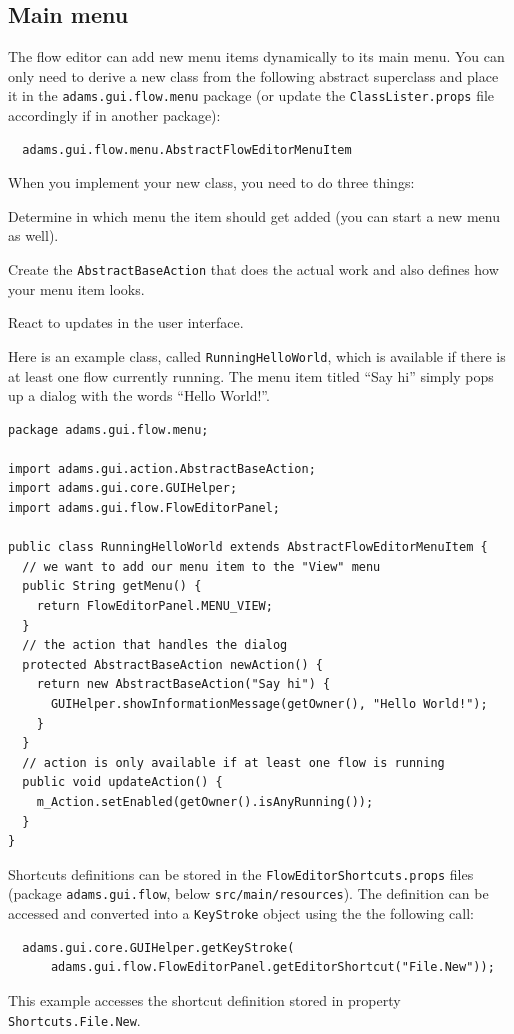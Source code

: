 \subsection{Main menu}
\label{floweditor_mainmenu}
The flow editor can add new menu items dynamically to its main menu. You can
only need to derive a new class from the following abstract superclass and
place it in the \texttt{adams.gui.flow.menu} package (or update the
\texttt{ClassLister.props} file accordingly if in another package):
\begin{verbatim}
  adams.gui.flow.menu.AbstractFlowEditorMenuItem
\end{verbatim}
When you implement your new class, you need to do three things:
\begin{tight_enumerate}
  \item Determine in which menu the item should get added (you can start a new
  menu as well).
  \item Create the \texttt{AbstractBaseAction} that does the actual work and
  also defines how your menu item looks.
  \item React to updates in the user interface.
\end{tight_enumerate}
Here is an example class, called \texttt{RunningHelloWorld}, which is available
if there is at least one flow currently running. The menu item titled ``Say hi'' 
simply pops up a dialog with the words ``Hello World!''.
{\scriptsize
\begin{verbatim}
package adams.gui.flow.menu;
  
import adams.gui.action.AbstractBaseAction;
import adams.gui.core.GUIHelper;
import adams.gui.flow.FlowEditorPanel;

public class RunningHelloWorld extends AbstractFlowEditorMenuItem {
  // we want to add our menu item to the "View" menu
  public String getMenu() {
    return FlowEditorPanel.MENU_VIEW;
  }
  // the action that handles the dialog
  protected AbstractBaseAction newAction() {
    return new AbstractBaseAction("Say hi") {
      GUIHelper.showInformationMessage(getOwner(), "Hello World!");
    }
  }
  // action is only available if at least one flow is running
  public void updateAction() {
    m_Action.setEnabled(getOwner().isAnyRunning());
  }
}
\end{verbatim}
}
Shortcuts definitions can be stored in the \texttt{FlowEditorShortcuts.props}
files (package \texttt{adams.gui.flow}, below \texttt{src/main/resources}). The
definition can be accessed and converted into a \texttt{KeyStroke} object using
the the following call:
\begin{verbatim}
  adams.gui.core.GUIHelper.getKeyStroke(
      adams.gui.flow.FlowEditorPanel.getEditorShortcut("File.New"));
\end{verbatim}
This example accesses the shortcut definition stored in property
\texttt{Shortcuts.File.New}.

